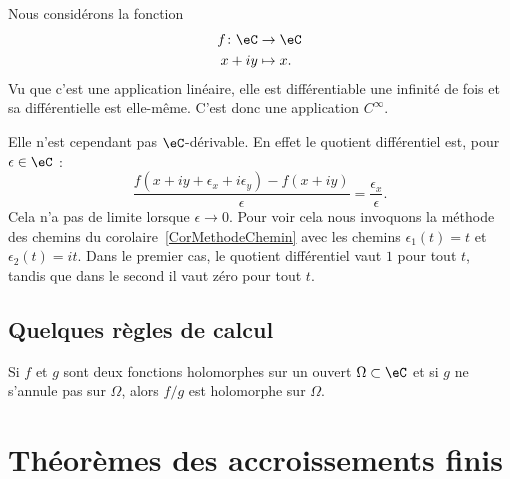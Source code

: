 \begin{example}
    Nous considérons la fonction
    \begin{equation}
        \begin{aligned}
            f\colon \eC&\to \eC \\
            x+iy&\mapsto x.
        \end{aligned}
    \end{equation}
    Vu que c'est une application linéaire, elle est différentiable une infinité de fois et sa différentielle est elle-même. C'est donc une application \( C^{\infty}\).

    Elle n'est cependant pas \( \eC\)-dérivable. En effet le quotient différentiel est, pour \( \epsilon\in \eC\) :
    \begin{equation}
        \frac{ f(x+iy+\epsilon_x+i\epsilon_y)-f(x+iy) }{ \epsilon }=\frac{ \epsilon_x }{ \epsilon }.
    \end{equation}
    Cela n'a pas de limite lorsque \( \epsilon\to 0\). Pour voir cela nous invoquons la méthode des chemins du corolaire~\ref{CorMethodeChemin} avec les chemins \( \epsilon_1(t)=t\) et \( \epsilon_2(t)=it\). Dans le premier cas, le quotient différentiel vaut \( 1\) pour tout \( t\), tandis que dans le second il vaut zéro pour tout \( t\).
\end{example}

\subsection{Quelques règles de calcul}

\begin{lemma}       \label{LEMooVDXOooUyFHXZ}
    Si \( f\) et \( g\) sont deux fonctions holomorphes sur un ouvert \( \Omega\subset \eC\) et si \( g\) ne s'annule pas sur \( \Omega\), alors \( f/g\) est holomorphe sur \( \Omega\).
\end{lemma}


\section{Théorèmes des accroissements finis}		\label{SecThoAccrsFinis}

